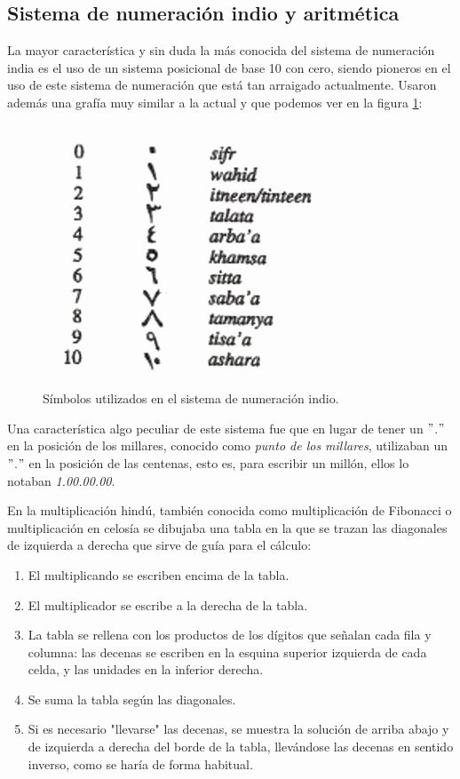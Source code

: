 \documentclass[a4paper, 11pt]{article}
\begin{document}
	\subsection{Sistema de numeración indio y aritmética}
		La mayor característica y sin duda la más conocida del sistema de numeración india es el uso de un sistema posicional
		de base 10 con cero, siendo pioneros en el uso de este sistema de numeración que está tan arraigado actualmente.
		Usaron además una grafía muy similar a la actual y que podemos ver en la figura \ref{fig:ind_numbers}:
		\begin{figure}[!ht]
			\centering
			\includegraphics[width = 7 cm]{indian_numbers.jpg}
			\caption{Símbolos utilizados en el sistema de numeración indio.}
			\label{fig:ind_numbers}
		\end{figure}

		Una característica algo peculiar de este sistema fue que en lugar de tener un $"$.$"$ en la posición de los millares,
		conocido como \textit{punto de los millares}, utilizaban un $"$.$"$ en la posición de las centenas, esto es, para
		escribir un millón, ellos lo notaban \textit{1.00.00.00}.

		En la multiplicación hindú, también conocida como multiplicación de Fibonacci o multiplicación en celosía se
		dibujaba una tabla en la que se trazan las diagonales de izquierda a derecha que sirve de guía para el cálculo:
		\begin{enumerate}
			\item El multiplicando se escriben encima de la tabla.
			\item El multiplicador se escribe a la derecha de la tabla.
			\item La tabla se rellena con los productos de los dígitos que señalan cada fila y columna: las decenas se
			escriben en la esquina superior izquierda de cada celda, y las unidades en la inferior derecha.
			\item Se suma la tabla según las diagonales.
			\item Si es necesario "llevarse" las decenas, se muestra la solución de arriba abajo y de izquierda a derecha
			del borde de la tabla, llevándose las decenas en sentido inverso, como se haría de forma habitual.
		\end{enumerate}
\end{document}
